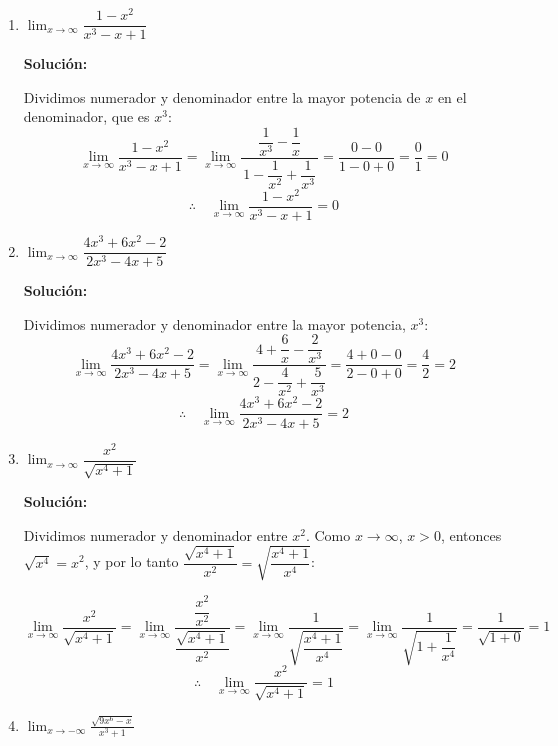 \documentclass[12pt]{article}
\newcommand{\solucion}{%
    \vspace{0.8em}%
    \textbf{Solución:}%
}
\begin{document}
\begin{enumerate}[label=\alph*)]
    \item $\lim_{x \to \infty} \dfrac{1 - x^2}{x^3 - x + 1}$

    \solucion

    Dividimos numerador y denominador entre la mayor potencia de $x$ en el denominador, que es $x^3$:
    \[
        \lim_{x\to\infty}\frac{1-x^2}{x^3-x+1}
        = \lim_{x\to\infty}\frac{\dfrac{1}{x^3} - \dfrac{1}{x}}{\,1 - \dfrac{1}{x^2} + \dfrac{1}{x^3}\,}
        = \frac{0 - 0}{1 - 0 + 0} = \frac{0}{1} = 0
    \]
    \[
        \therefore\quad \lim_{x\to\infty}\frac{1-x^2}{x^3-x+1} = 0
    \]

    \item $\lim_{x \to \infty} \dfrac{4x^3 + 6x^2 - 2}{2x^3 - 4x + 5}$

    \solucion

    Dividimos numerador y denominador entre la mayor potencia, $x^3$:
    \[
        \lim_{x\to\infty}\frac{4x^3+6x^2-2}{2x^3-4x+5}
        = \lim_{x\to\infty}\frac{4 + \dfrac{6}{x} - \dfrac{2}{x^3}}{2 - \dfrac{4}{x^2} + \dfrac{5}{x^3}}
        = \frac{4+0-0}{2-0+0} = \frac{4}{2} = 2
    \]
    \[
        \therefore\quad \lim_{x\to\infty}\frac{4x^3+6x^2-2}{2x^3-4x+5} = 2
    \]

    \item $\lim_{x \to \infty} \dfrac{x^2}{\sqrt{x^4 + 1}}$

    \solucion

    Dividimos numerador y denominador entre $x^2$. Como $x\to\infty$, $x > 0$,
    entonces $\sqrt{x^4} = x^2$, y por lo tanto $\dfrac{\sqrt{x^4+1}}{x^2} = \sqrt{\dfrac{x^4+1}{x^4}}$:

    \[
        \lim_{x\to\infty}\frac{x^2}{\sqrt{x^4+1}}
        = \lim_{x\to\infty}\frac{\dfrac{x^2}{x^2}}{\dfrac{\sqrt{x^4+1}}{x^2}}
        = \lim_{x\to\infty}\frac{1}{\sqrt{\dfrac{x^4+1}{x^4}}}
        = \lim_{x\to\infty}\frac{1}{\sqrt{1+\dfrac{1}{x^4}}}
        = \frac{1}{\sqrt{1+0}}
        = 1
    \]
    \[
        \therefore\quad \lim_{x\to\infty}\frac{x^2}{\sqrt{x^4+1}} = 1
    \]

    \item $\displaystyle \lim_{x \to -\infty} \frac{\sqrt{9x^6-x}}{x^3+1}$


\end{enumerate}
\end{document}
